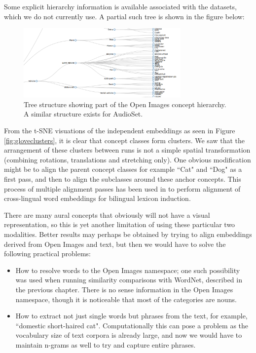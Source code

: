 Some explicit hierarchy information is available associated with the datasets, which we do not currently use. A partial such tree is shown in the figure below:

\begin{figure}[H]
\label{fig:tree}
    \centering
    \includegraphics[width=0.75\textwidth]{images/conclusions/tree.png}
    \caption{
        Tree structure showing part of the Open Images concept hierarchy. A similar structure exists for AudioSet.
    }
\end{figure}

From the t-SNE visuations of the independent embeddings as seen in Figure \ref{fig:gloveclusters}, it is clear that concept classes form clusters. We saw that the arrangement of these clusters between runs is not a simple spatial transformation (combining rotations, translations and stretching only). One obvious modification might be to align the parent concept classes for example ``Cat" and ``Dog" as a first pass, and then to align the subclasses around these anchor concepts. This process of multiple alignment passes has been used in \cite{UnsupervisedAlignmentWP} to perform alignment of cross-lingual word embeddings for bilingual lexicon induction. 

There are many aural concepts that obviously will not have a visual representation, so this is yet another limitation of using these particular two modalities. Better results may perhaps be obtained by trying to align embeddings derived from Open Images and text, but then we would have to solve the following practical problems:

\begin{itemize}
    \item How to resolve words to the Open Images namespace; one such possibility was used when running similarity comparisons with WordNet, described in the previous chapter. There is no sense information in the Open Images namespace, though it is noticeable that most of the categories are nouns.  
    \item How to extract not just single words but phrases from the text, for example, ``domestic short-haired cat". Computationally this can pose a problem as the vocabulary size of text corpora is already large, and now we would have to maintain n-grams as well to try and capture entire phrases. 
\end{itemize}


